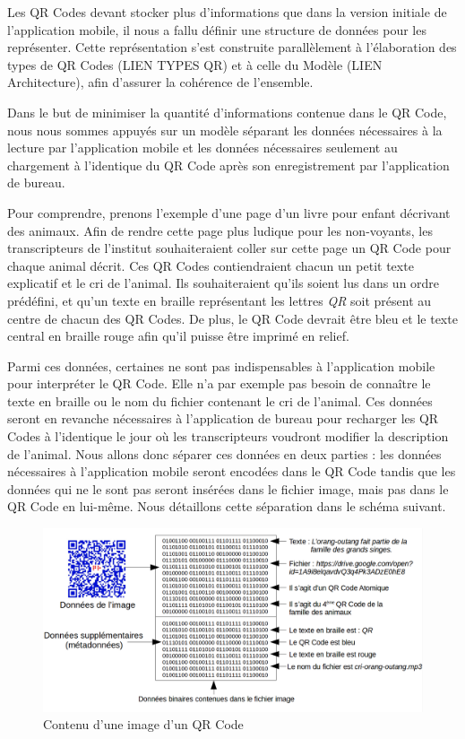 \par
Les QR Codes devant stocker plus d'informations que dans la version initiale de l'application mobile, il nous a fallu définir une structure de données pour les représenter. Cette représentation s'est construite parallèlement à l'élaboration des types de QR Codes (LIEN TYPES QR) et à celle du Modèle (LIEN Architecture), afin d'assurer la cohérence de l'ensemble.\\

\par
Dans le but de minimiser la quantité d'informations contenue dans le QR Code, nous nous sommes appuyés sur un modèle séparant les données nécessaires à la lecture par l'application mobile et les données nécessaires seulement au chargement à l'identique du QR Code après son enregistrement par l'application de bureau.\\

\par
Pour comprendre, prenons l'exemple d'une page d'un livre pour enfant décrivant des animaux. Afin de rendre cette page plus ludique pour les non-voyants, les transcripteurs de l'institut souhaiteraient coller sur cette page un QR Code pour chaque animal décrit. Ces QR Codes contiendraient chacun un petit texte explicatif et le cri de l'animal. Ils souhaiteraient qu'ils soient lus dans un ordre prédéfini, et qu'un texte en braille représentant les lettres \textit{QR} soit présent au centre de chacun des QR Codes. De plus, le QR Code devrait être bleu et le texte central en braille rouge afin qu'il puisse être imprimé en relief.
\par
Parmi ces données, certaines ne sont pas indispensables à l'application mobile pour interpréter le QR Code. Elle n'a par exemple pas besoin de connaître le texte en braille ou le nom du fichier contenant le cri de l'animal. Ces données seront en revanche nécessaires à l'application de bureau pour recharger les QR Codes à l'identique le jour où les transcripteurs voudront modifier la description de l'animal. Nous allons donc séparer ces données en deux parties : les données nécessaires à l'application mobile seront encodées dans le QR Code tandis que les données qui ne le sont pas seront insérées dans le fichier image, mais pas dans le QR Code en lui-même. Nous détaillons cette séparation dans le schéma suivant.



\begin{figure}[]
	\centering
   \includegraphics[scale=0.33]{img/schema_representation_donnees.png}
   \caption{Contenu d'une image d'un QR Code}
\end{figure}


